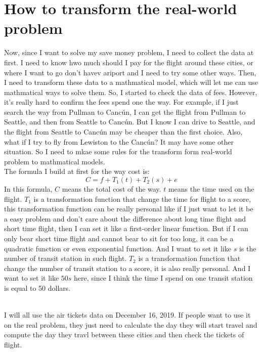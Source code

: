 \documentclass[12pt]{article}
\begin{document}
    \section{How to transform the real-world problem}
        Now, since I want to solve my save money problem, I need to collect the data
        at first. I need to know hwo much should I pay for the flight around these
        cities, or where I want to go don't havev ariport and I need to try some
        other ways. Then, I need to transform these data to a mathmatical model,
        which will let me can use mathmatical ways to solve them. So, I started to
        check the data of fees. However, it's really hard to confirm the fees spend
        one the way. For example, if I just search the way from Pullman to Canc\'un,
        I can get the flight from Pullman to Seattle, and then from Seattle to Canc\'un.
        But I know I can drive to Seattle, and the flight from Seattle to Canc\'un may
        be cheaper than the first choice. Also, what if I try to fly from Lewiston to
        the Canc\'un? It may have some other situation. So I need to mkae some
        rules for the transform form real-world problem to mathmatical models. \\
        The formula I build at first for the way cost is:
        $$C=f+T_1(t)+T_2(s)+e$$
        In this formula,
        $C$ means the total cost of the way.
        $t$ means the time used on the flight.
        $T_1$ is a transformation function that change the time for flight to a score,
        this transformation function can be really personal like if I just want to let
        it be a easy problem and don't care about the difference about long time flight
        and short time flight, then I can set it like a first-order linear function. But
        if I can only bear short time flight and cannot bear to sit for too long, it can
        be a quadratic function or even exponential function. And I want to set it like
        $s$ is the number of transit station in such flight.
        $T_2$ is a transformation function that change the number of transit station to
        a score, it is also really personal. And I want to set it like $50s$ here,
        since I think the time I spend on one transit station is equal to 50 dollars.

        \\I will all use the air tickets data on December 16, 2019. If people want to
        use it on the real problem, they just need to calculate the day they will start
        travel and compute the day they travl between these cities and then check
        the tickets of flight.
\end{document}
